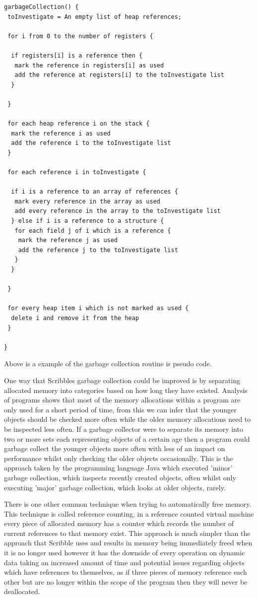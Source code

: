 \documentclass[]{final_report}
\begin{document}
\begin{verbatim}
garbageCollection() {
 toInvestigate = An empty list of heap references;

 for i from 0 to the number of registers {

  if registers[i] is a reference then {
   mark the reference in registers[i] as used
   add the reference at registers[i] to the toInvestigate list
  }

 }
	
 for each heap reference i on the stack {
  mark the reference i as used
  add the reference i to the toInvestigate list
 }
	
 for each reference i in toInvestigate {

  if i is a reference to an array of references {
   mark every reference in the array as used
   add every reference in the array to the toInvestigate list		
  } else if i is a reference to a structure {
   for each field j of i which is a reference {
    mark the reference j as used
    add the reference j to the toInvestigate list
   }
  }
  
 }

 for every heap item i which is not marked as used {
  delete i and remove it from the heap
 }

}
\end{verbatim}
Above is a example of the garbage collection routine is pseudo code.

One way that Scribbles garbage collection could be improved is by separating allocated memory into categories based on how long they have existed. Analysis of programs shows that most of the memory allocations within a program are only used for a short period of time, from this we can infer that the younger objects should be checked more often while the older memory allocations need to be inspected less often. If a garbage collector were to separate its memory into two or more sets each representing objects of a certain age then a program could garbage collect the younger objects more often with less of an impact on performance whilst only checking the older objects occasionally. This is the approach taken by the programming language Java which executed 'minor' garbage collection, which inspects recently created objects, often whilst only executing 'major' garbage collection, which looks at older objects, rarely\cite{JVMGC}.

There is one other common technique when trying to automatically free memory. This technique is called reference counting, in a reference counted virtual machine every piece of allocated memory has a counter which records the number of current references to that memory exist. This approach is much simpler than the approach that Scribble uses and results in memory being immediately freed when it is no longer used however it has the downside of every operation on dynamic data taking an increased amount of time and potential issues regarding objects which have references to themselves, as if three pieces of memory reference each other but are no longer within the scope of the program then they will never be deallocated.
\end{document}
